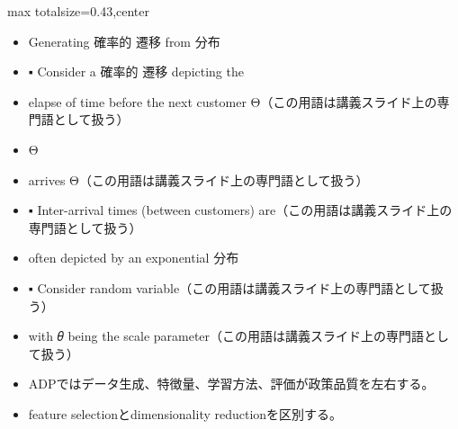 \clearpage
{}
\begin{minipage}[t]{0.405\textwidth}
\begin{adjustbox}{max totalsize={\textwidth}{0.43\textheight},center}
\begin{minipage}{\textwidth}\scriptsize
{}\begin{itemize}
\item Generating 確率的 遷移 from 分布
\item ▪ Consider a 確率的 遷移 depicting the
\item elapse of time before the next customer Θ（この用語は講義スライド上の専門語として扱う）
\item Θ
\item arrives Θ（この用語は講義スライド上の専門語として扱う）
\item ▪ Inter-arrival times (between customers) are（この用語は講義スライド上の専門語として扱う）
\item often depicted by an exponential 分布
\item ▪ Consider random variable（この用語は講義スライド上の専門語として扱う）
\item with 𝜃 being the scale parameter（この用語は講義スライド上の専門語として扱う）
\end{itemize}\begin{itemize}
\item ADPではデータ生成、特徴量、学習方法、評価が政策品質を左右する。
\item feature selectionとdimensionality reductionを区別する。
\end{itemize}
\end{minipage}
\end{adjustbox}
\end{minipage}\hfill
